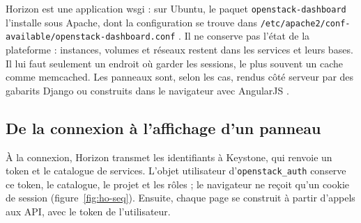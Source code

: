 Horizon est une application \gls{wsgi} : sur Ubuntu, le paquet \texttt{openstack-dashboard} l'installe sous Apache, dont la
configuration se trouve dans \texttt{/etc/apache2/\allowbreak conf-available/\allowbreak openstack-dashboard.conf} \parencite{horizon-install}. Il ne
conserve pas l'état de la plateforme : instances, volumes et réseaux restent dans les services et leurs bases. Il lui faut
seulement un endroit où garder les sessions, le plus souvent un cache comme \gls{memcached}. Les panneaux sont, selon les cas,
rendus côté serveur par des gabarits Django ou construits dans le navigateur avec AngularJS \parencite{horizon-customizing}.

\subsection{De la connexion à l'affichage d'un panneau}\label{sec:ho-requete}

À la connexion, Horizon transmet les identifiants à Keystone, qui renvoie un \gls{token} et le \gls{catalogue} de services.
L'objet utilisateur d'\texttt{openstack\_\allowbreak auth} conserve ce token, le catalogue, le projet et les rôles
\parencite{horizon-auth-user} ; le navigateur ne reçoit qu'un cookie de session (figure~\ref{fig:ho-seq}). Ensuite, chaque
page se construit à partir d'appels aux API, avec le token de l'utilisateur.

